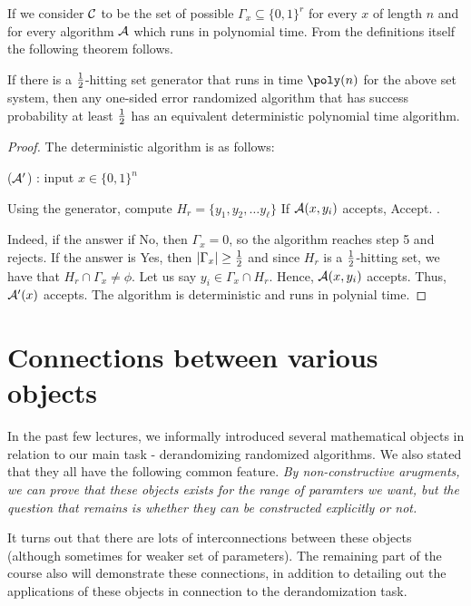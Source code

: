 If we consider ${\cal{C}}$ to be the set of possible $\Gamma_x \subseteq \{0,1\}^r$ for every $x$ of length $n$ and for every algorithm ${\cal{A}}$ which runs in polynomial time. From the definitions itself the following theorem follows.
\begin{theorem}
If there is a $\frac{1}{2}$-hitting set generator that runs in time $\poly(n)$ for the above set system, then any one-sided error randomized algorithm that has success probability at least $\frac{1}{2}$ has an equivalent deterministic polynomial time algorithm.
\end{theorem}

\begin{proof}
The deterministic algorithm is as follows:
\begin{algorithm}
\label{alg:hittingset-algo}
\caption{(${\cal{A}'}$) : input $x \in \{0,1\}^n$} 
\begin{algorithmic}[1]
\State Using the generator, compute $H_r = \{y_1, y_2, \ldots y_\ell\}$ 
	\State If ${\cal{A}}(x,y_i)$ accepts, {\sc Accept}.
\EndFor
{}.
\end{algorithmic}
\end{algorithm}

Indeed, if the answer if {\sc No}, then $\Gamma_x=0$, so the algorithm reaches step 5 and rejects. If the answer is {\sc Yes}, then $|\Gamma_x| \ge \frac{1}{2}$ and since $H_r$ is a $\frac{1}{2}$-hitting set, we have that $H_r \cap \Gamma_x \ne \phi$. Let us say $y_i \in \Gamma_x \cap H_r$. Hence, ${\cal{A}}(x,y_i)$ accepts. Thus, ${\cal{A}'}(x)$ accepts. The algorithm is deterministic and runs in polynial time.
\end{proof}

\section{Connections between various objects}

In the past few lectures, we informally introduced several mathematical objects in relation to our main task - derandomizing randomized algorithms. We also stated that they all have the following common feature.
{\em By non-constructive arugments, we can prove that these objects exists for the range of paramters we want, but the question that remains is whether they can be constructed explicitly or not.}

It turns out that there are lots of interconnections between these objects (although sometimes for weaker set of parameters). The remaining part of the course also will demonstrate these connections, in addition to detailing out the applications of these objects in connection to the derandomization task.\\

